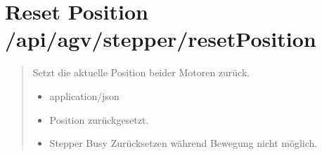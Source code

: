 \documentclass[letterpaper,10pt,english]{sphinxmanual}
\begin{document}
\section{Reset Position \textendash{} /api/agv/stepper/resetPosition}
\label{\detokenize{agv_rest_api_stepper:reset-position-api-agv-stepper-resetposition}}\label{\detokenize{agv_rest_api_stepper:post-api-agv-stepper-resetposition}}

\begin{fulllineitems}
\label{\detokenize{agv_rest_api_stepper:post--api-agv-stepper-resetPosition}}
\pysigstartsignatures
\pysigline
{}
\pysigstopsignatures\begin{quote}\begin{description}
\sphinxAtStartPar
Setzt die aktuelle Position beider Motoren zurück.

\begin{itemize}
\item {} 
\sphinxAtStartPar
{} \textendash{} application/json

\end{itemize}

\begin{itemize}
\item {} 
\sphinxAtStartPar
{} \textendash{} Position zurückgesetzt.

\item {} 
\sphinxAtStartPar
{} \textendash{} Stepper Busy \textendash{} Zurücksetzen während Bewegung nicht möglich.

\end{itemize}

\end{description}\end{quote}

\end{fulllineitems}


\sphinxAtStartPar
{}

\begin{sphinxVerbatim}[commandchars=\\\{\}]
\end{sphinxVerbatim}
\end{document}
